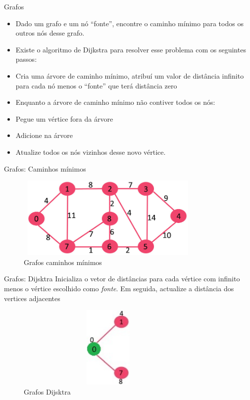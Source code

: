 \begin{frame}
	\begin{block}{Grafos}
		\begin{itemize}
			\item Dado um grafo e um nó “fonte”, encontre o caminho mínimo para todos os outros nós desse grafo.
			\item Existe o algoritmo de Dijkstra para resolver esse problema com os seguintes passos:
			\item Cria uma árvore de caminho mínimo, atribuí um valor de distância infinito para cada nó menos o “fonte” que terá distância zero
			\item Enquanto a árvore de caminho mínimo não contiver todos os nós:
			\item Pegue um vértice fora da árvore
			\item Adicione na árvore
			\item Atualize todos os nós vizinhos desse novo vértice.
		\end{itemize}
	\end{block}
\end{frame}

\begin{frame}
	\begin{block}{Grafos: Caminhos mínimos}
		\begin{figure}[!htb]
			\centering	  
			\includegraphics[height=4cm, width = 9cm]{./pic/Fig-11.jpg}
			\caption{Grafos caminhos mínimos}
		\end{figure}
	\end{block}
\end{frame}

\begin{frame}
	\begin{block}{Grafos: Dijsktra}
		Inicializa o vetor de distâncias para cada vértice com infinito menos o vértice escolhido como \emph{fonte}. Em seguida, actualize a distância dos vertices adjacentes
		\begin{figure}[!htb]
			\centering	  
			\includegraphics[height=4cm, width = 9cm]{./pic/MST1.jpg}
			\caption{Grafos Dijsktra}
		\end{figure}
	\end{block}
\end{frame}

